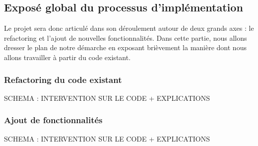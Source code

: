 \subsection{Exposé global du processus d'implémentation}
Le projet sera donc articulé dans son déroulement autour de deux
grands axes : le refactoring et l'ajout de nouvelles
fonctionnalités. Dans cette partie, nous allons dresser le plan de
notre démarche en exposant brièvement la manière dont nous allons
travailler à partir du code existant.

\subsubsection{Refactoring du code existant}

SCHEMA : INTERVENTION SUR LE CODE + EXPLICATIONS


\subsubsection{Ajout de fonctionnalités}

SCHEMA : INTERVENTION SUR LE CODE + EXPLICATIONS
